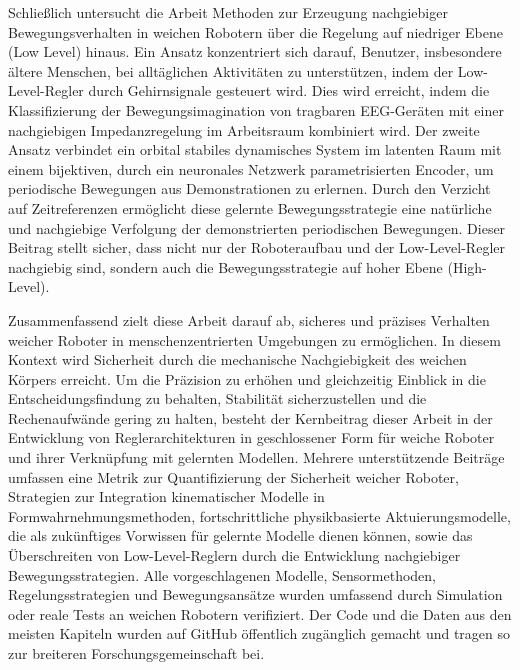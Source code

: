 {Schließlich untersucht die Arbeit Methoden zur Erzeugung nachgiebiger Bewegungsverhalten in weichen Robotern über die Regelung auf niedriger Ebene (Low Level) hinaus. Ein Ansatz konzentriert sich darauf, Benutzer, insbesondere ältere Menschen, bei alltäglichen Aktivitäten zu unterstützen, indem der Low-Level-Regler durch Gehirnsignale gesteuert wird. Dies wird erreicht, indem die Klassifizierung der Bewegungsimagination von tragbaren EEG-Geräten mit einer nachgiebigen Impedanzregelung im Arbeitsraum kombiniert wird. Der zweite Ansatz verbindet ein orbital stabiles dynamisches System im latenten Raum mit einem bijektiven, durch ein neuronales Netzwerk parametrisierten Encoder, um periodische Bewegungen aus Demonstrationen zu erlernen. Durch den Verzicht auf Zeitreferenzen ermöglicht diese gelernte Bewegungsstrategie eine natürliche und nachgiebige Verfolgung der demonstrierten periodischen Bewegungen. Dieser Beitrag stellt sicher, dass nicht nur der Roboteraufbau und der Low-Level-Regler nachgiebig sind, sondern auch die Bewegungsstrategie auf hoher Ebene (High-Level).

Zusammenfassend zielt diese Arbeit darauf ab, sicheres und präzises Verhalten weicher Roboter in menschenzentrierten Umgebungen zu ermöglichen. In diesem Kontext wird Sicherheit durch die mechanische Nachgiebigkeit des weichen Körpers erreicht. Um die Präzision zu erhöhen und gleichzeitig Einblick in die Entscheidungsfindung zu behalten, Stabilität sicherzustellen und die Rechenaufwände gering zu halten, besteht der Kernbeitrag dieser Arbeit in der Entwicklung von Reglerarchitekturen in geschlossener Form für weiche Roboter und ihrer Verknüpfung mit gelernten Modellen. Mehrere unterstützende Beiträge umfassen eine Metrik zur Quantifizierung der Sicherheit weicher Roboter, Strategien zur Integration kinematischer Modelle in Formwahrnehmungsmethoden, fortschrittliche physikbasierte Aktuierungsmodelle, die als zukünftiges Vorwissen für gelernte Modelle dienen können, sowie das Überschreiten von Low-Level-Reglern durch die Entwicklung nachgiebiger Bewegungsstrategien. Alle vorgeschlagenen Modelle, Sensormethoden, Regelungsstrategien und Bewegungsansätze wurden umfassend durch Simulation oder reale Tests an weichen Robotern verifiziert. Der Code und die Daten aus den meisten Kapiteln wurden auf GitHub öffentlich zugänglich gemacht und tragen so zur breiteren Forschungsgemeinschaft bei.
}



